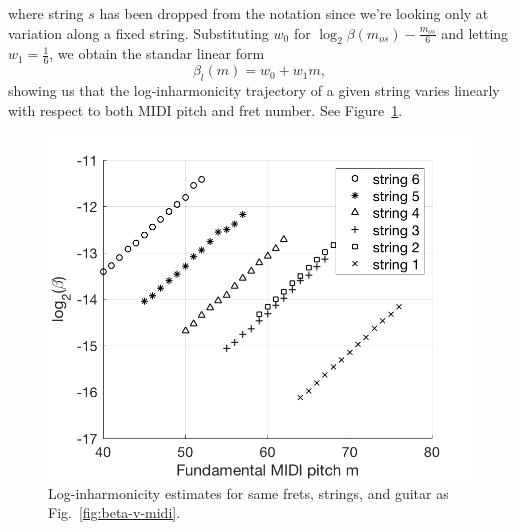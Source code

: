 \documentclass[convention,peer-reviewed]{aesconf}
\begin{document}
where string $s$ has been dropped from the notation since we're looking only at variation along a fixed string. Substituting $w_0$ for $\log_2\beta(m_{os})-\frac{m_{os}}{6}$ and letting $w_1 = \frac{1}{6}$, we obtain the standar linear form
\begin{equation}
\label{eq:linear-traj}
\beta_l(m) = w_0 + w_1m,
\end{equation}
showing us that the log-inharmonicity trajectory of a given string varies linearly with respect to both MIDI pitch and fret number. See Figure~\ref{fig:log-beta-v-midi}.
\begin{figure}[!htbp] 
\centering
\includegraphics[scale=0.25]{log-beta-v-midi}
%
\caption{Log-inharmonicity estimates for same frets, strings, and guitar as Fig.~\ref{fig:beta-v-midi}.}
\label{fig:log-beta-v-midi}
\end{figure}
\end{document}
